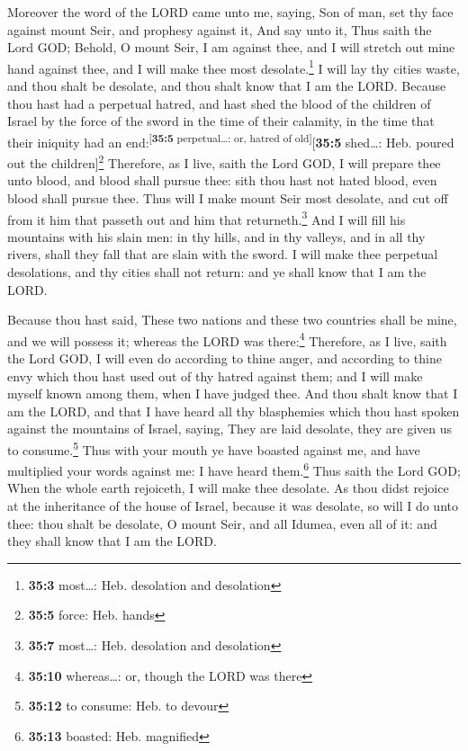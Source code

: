  Moreover the word of the LORD came unto me, saying,
 Son of man, set thy face against mount Seir, and prophesy
against it,  And say unto it, Thus saith the Lord GOD;
Behold, O mount Seir, I am against thee, and I will stretch out mine
hand against thee, and I will make thee most desolate.\footnote{\textbf{35:3}
  most\ldots: Heb. desolation and desolation}  I will lay
thy cities waste, and thou shalt be desolate, and thou shalt know that I
am the LORD.  Because thou hast had a perpetual hatred,
and hast shed the blood of the children of Israel by the force of the
sword in the time of their calamity, in the time that their iniquity had
an end:\textsuperscript{{[}\textbf{35:5} perpetual\ldots: or, hatred of
old{]}}{[}\textbf{35:5} shed\ldots: Heb. poured out the
children{]}\footnote{\textbf{35:5} force: Heb. hands} 
Therefore, as I live, saith the Lord GOD, I will prepare thee unto
blood, and blood shall pursue thee: sith thou hast not hated blood, even
blood shall pursue thee.  Thus will I make mount Seir most
desolate, and cut off from it him that passeth out and him that
returneth.\footnote{\textbf{35:7} most\ldots: Heb. desolation and
  desolation}  And I will fill his mountains with his
slain men: in thy hills, and in thy valleys, and in all thy rivers,
shall they fall that are slain with the sword.  I will
make thee perpetual desolations, and thy cities shall not return: and ye
shall know that I am the LORD.

 Because thou hast said, These two nations and these two
countries shall be mine, and we will possess it; whereas the LORD was
there:\footnote{\textbf{35:10} whereas\ldots: or, though the LORD was
  there}  Therefore, as I live, saith the Lord GOD, I
will even do according to thine anger, and according to thine envy which
thou hast used out of thy hatred against them; and I will make myself
known among them, when I have judged thee.  And thou
shalt know that I am the LORD, and that I have heard all thy blasphemies
which thou hast spoken against the mountains of Israel, saying, They are
laid desolate, they are given us to consume.\footnote{\textbf{35:12} to
  consume: Heb. to devour}  Thus with your mouth ye have
boasted against me, and have multiplied your words against me: I have
heard them.\footnote{\textbf{35:13} boasted: Heb. magnified}
 Thus saith the Lord GOD; When the whole earth rejoiceth,
I will make thee desolate.  As thou didst rejoice at the
inheritance of the house of Israel, because it was desolate, so will I
do unto thee: thou shalt be desolate, O mount Seir, and all Idumea, even
all of it: and they shall know that I am the LORD.

